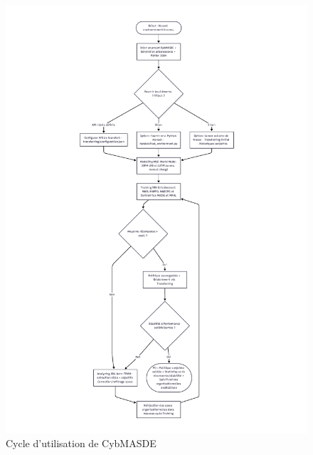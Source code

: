 \begin{figure}
  \centering
  \includegraphics[trim={5cm 1cm 5cm 1cm},clip,height=\textheight]{figures/CybMASDE_user_flowchart.pdf}
  \caption{Cycle d'utilisation de CybMASDE}
  \label{fig:cybmasde_cycle}
\end{figure}


